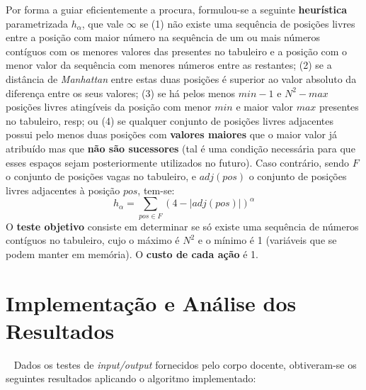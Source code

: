 \documentclass[12pt]{exam}
\renewcommand\_{\textunderscore\linebreak[1]}
\begin{document}
        \indent Por forma a guiar eficientemente a procura, formulou-se a seguinte \textbf{heurística} parametrizada $h_\alpha$, que vale $\infty$ se (1) não existe uma sequência de posições livres entre a posição com maior número na sequência de um ou mais números contíguos com os menores valores das presentes no tabuleiro e a posição com o menor valor da sequência com menores números entre as restantes; (2) se a distância de \textit{Manhattan} entre estas duas posições é superior ao valor absoluto da diferença entre os seus valores; (3) se há pelos menos $min - 1$ e $N^2 - max$ posições livres atingíveis da posição com menor $min$ e maior valor $max$ presentes no tabuleiro, resp; ou (4) se qualquer conjunto de posições livres adjacentes possui pelo menos duas posições com \textbf{valores maiores} que o maior valor já atribuído mas que \textbf{não são sucessores} (tal é uma condição necessária para que esses espaços sejam posteriormente utilizados no futuro). Caso contrário, sendo $F$ o conjunto de posições vagas no tabuleiro, e $adj(pos)$ o conjunto de posições livres adjacentes à posição $pos$, tem-se:
        \vspace*{5mm}
        \[
            h_\alpha = \sum_{pos \in F} (4 - |adj(pos)|)^\alpha
            \]
        \indent O \textbf{teste objetivo} consiste em determinar se só existe uma sequência de números contíguos no tabuleiro, cujo o máximo é $N^2$ e o mínimo é 1 (variáveis que se podem manter em memória). O \textbf{custo de cada ação} é 1.
    
    \pagebreak

    \section{Implementação e Análise dos Resultados}~
        \indent Dados os testes de \textit{input/output} fornecidos pelo corpo docente, obtiveram-se os seguintes resultados aplicando o algoritmo implementado:\\
\end{document}
